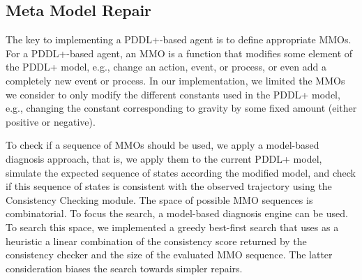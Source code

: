\documentclass{article}
\begin{document}


\subsection{Meta Model Repair}


The key to implementing a PDDL+-based \hydra agent is to define appropriate MMOs. 
For a PDDL+-based \hydra agent, an MMO is a function that modifies some element of the PDDL+ model, e.g., change an action, event, or process, or even add a completely new event or process. 
In our implementation, we limited the MMOs we consider to only modify the different constants used in the PDDL+ model, e.g., changing the constant corresponding to gravity by some fixed amount (either positive or negative). 


To check if a sequence of MMOs should be used, we apply a model-based diagnosis approach, that is, we apply them to the current PDDL+ model, simulate the expected sequence of states according the modified model, and check if this sequence of states is consistent with the observed trajectory using the Consistency Checking module. 
The space of possible MMO sequences is combinatorial. 
To focus the search, a model-based diagnosis engine can be used. 
To search this space, we implemented a greedy best-first search that uses as a heuristic a linear combination of the consistency score returned by the consistency checker and the size of the evaluated MMO sequence. 
The latter consideration biases the search towards simpler repairs. 
\end{document}
